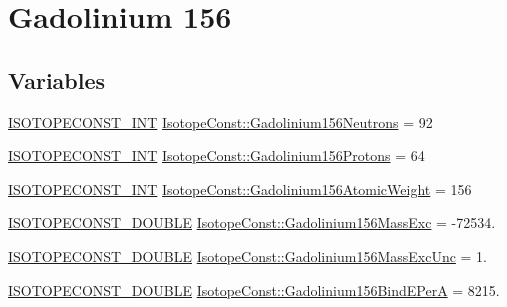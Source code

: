 \hypertarget{group___isotope_const-_gadolinium-_gd156}{}\section{Gadolinium 156}
\label{group___isotope_const-_gadolinium-_gd156}
\subsection*{Variables}
\begin{DoxyCompactItemize}
\item 
\mbox{\hyperlink{group___isotope_const-_macros_ga5f18360b3e99483a35c32d789e62621c}{I\+S\+O\+T\+O\+P\+E\+C\+O\+N\+S\+T\+\_\+\+I\+NT}} \mbox{\hyperlink{group___isotope_const-_gadolinium-_gd156_gad84a2e04e95572411e2cef07592ddd80}{Isotope\+Const\+::\+Gadolinium156\+Neutrons}} = 92
\item 
\mbox{\hyperlink{group___isotope_const-_macros_ga5f18360b3e99483a35c32d789e62621c}{I\+S\+O\+T\+O\+P\+E\+C\+O\+N\+S\+T\+\_\+\+I\+NT}} \mbox{\hyperlink{group___isotope_const-_gadolinium-_gd156_ga0cdc0c787a93cfcf23a788611e4178dd}{Isotope\+Const\+::\+Gadolinium156\+Protons}} = 64
\item 
\mbox{\hyperlink{group___isotope_const-_macros_ga5f18360b3e99483a35c32d789e62621c}{I\+S\+O\+T\+O\+P\+E\+C\+O\+N\+S\+T\+\_\+\+I\+NT}} \mbox{\hyperlink{group___isotope_const-_gadolinium-_gd156_ga719557cb244eedeba37b04efdaa7e04d}{Isotope\+Const\+::\+Gadolinium156\+Atomic\+Weight}} = 156
\item 
\mbox{\hyperlink{group___isotope_const-_macros_ga8f45a7272ce02c0b4c65c44636ed719a}{I\+S\+O\+T\+O\+P\+E\+C\+O\+N\+S\+T\+\_\+\+D\+O\+U\+B\+LE}} \mbox{\hyperlink{group___isotope_const-_gadolinium-_gd156_gaa5c715b8de4c998b885557512fcf649b}{Isotope\+Const\+::\+Gadolinium156\+Mass\+Exc}} = -\/72534.
\item 
\mbox{\hyperlink{group___isotope_const-_macros_ga8f45a7272ce02c0b4c65c44636ed719a}{I\+S\+O\+T\+O\+P\+E\+C\+O\+N\+S\+T\+\_\+\+D\+O\+U\+B\+LE}} \mbox{\hyperlink{group___isotope_const-_gadolinium-_gd156_gae2d2e5412904ae57a8d8f6064f405bcd}{Isotope\+Const\+::\+Gadolinium156\+Mass\+Exc\+Unc}} = 1.
\item 
\mbox{\hyperlink{group___isotope_const-_macros_ga8f45a7272ce02c0b4c65c44636ed719a}{I\+S\+O\+T\+O\+P\+E\+C\+O\+N\+S\+T\+\_\+\+D\+O\+U\+B\+LE}} \mbox{\hyperlink{group___isotope_const-_gadolinium-_gd156_ga5026894c986c44ec174554097cc7e0ee}{Isotope\+Const\+::\+Gadolinium156\+Bind\+E\+PerA}} = 8215.
\item 

\end{DoxyCompactItemize}
